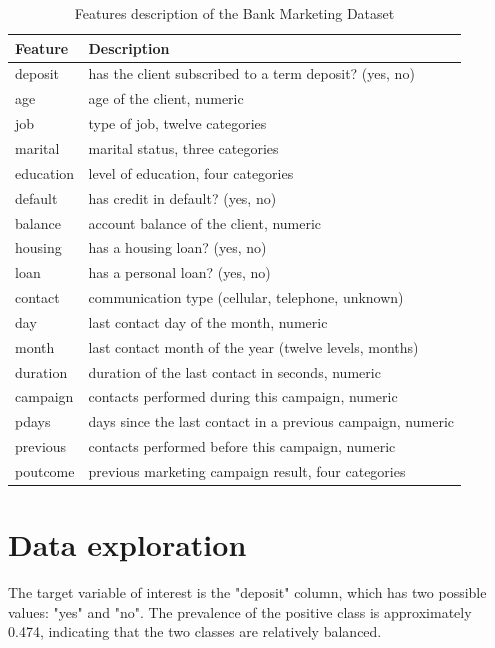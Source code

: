 \documentclass[conference]{IEEEtran}
\begin{document}
\begin{table}[htbp]
\caption{Features description of the Bank Marketing Dataset}
\label{tab1}
\begin{center}
\begin{tabular}{|l|l|}
\hline
\textbf{Feature} & \textbf{Description} \\
\hline
deposit & has the client subscribed to a term deposit? (yes, no) \\
\hline
age & age of the client, numeric \\
\hline
job & type of job, twelve categories \\
\hline
marital & marital status, three categories \\
\hline
education & level of education, four categories \\
\hline
default & has credit in default? (yes, no) \\
\hline
balance & account balance of the client, numeric \\
\hline
housing & has a housing loan? (yes, no) \\
\hline
loan & has a personal loan? (yes, no) \\
\hline
contact & communication type (cellular, telephone, unknown) \\
\hline
day & last contact day of the month, numeric \\
\hline
month & last contact month of the year (twelve levels, months) \\
\hline
duration & duration of the last contact in seconds, numeric \\
\hline
campaign & contacts performed during this campaign, numeric \\
\hline
pdays & days since the last contact in a previous campaign, numeric \\
\hline
previous & contacts performed before this campaign, numeric \\
\hline
poutcome & previous marketing campaign result, four categories \\
\hline
\end{tabular}
\end{center}
\end{table}

\section{Data exploration}

The target variable of interest is the "deposit" column, which has two possible values: "yes" and "no". The prevalence of the positive class is approximately 0.474, indicating that the two classes are relatively balanced.
\end{document}
